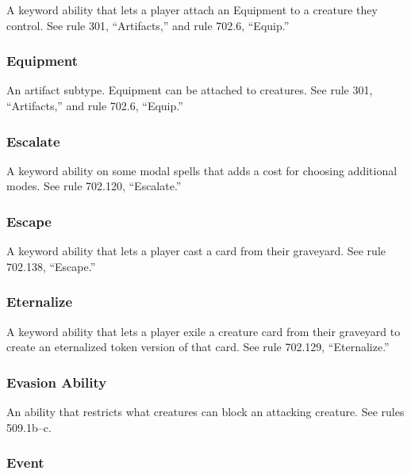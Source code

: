 {{{{{{{{{A keyword ability that lets a player attach an Equipment to a creature they control. See rule 301, “Artifacts,” and rule 702.6, “Equip.”

\subsubsection*{Equipment}

An artifact subtype. Equipment can be attached to creatures. See rule 301, “Artifacts,” and rule 702.6, “Equip.”

\subsubsection*{Escalate}

A keyword ability on some modal spells that adds a cost for choosing additional modes. See rule 702.120, “Escalate.”

\subsubsection*{Escape}

A keyword ability that lets a player cast a card from their graveyard. See rule 702.138, “Escape.”

\subsubsection*{Eternalize}

A keyword ability that lets a player exile a creature card from their graveyard to create an eternalized token version of that card. See rule 702.129, “Eternalize.”

\subsubsection*{Evasion Ability}

An ability that restricts what creatures can block an attacking creature. See rules 509.1b–c.

\subsubsection*{Event}

}}}}}}}}}
